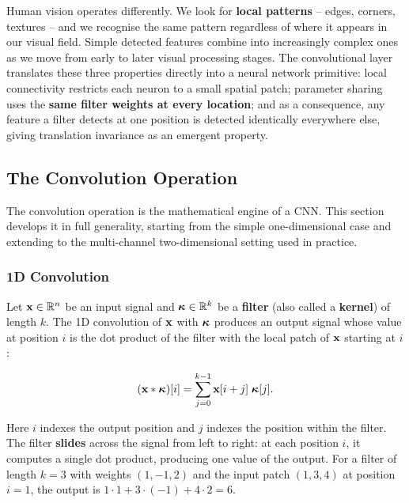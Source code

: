Human vision operates differently. We look for \textbf{local patterns} -- edges, corners, textures -- and we recognise the same pattern regardless of where it appears in our visual field. Simple detected features combine into increasingly complex ones as we move from early to later visual processing stages. The convolutional layer translates these three properties directly into a neural network primitive: local connectivity restricts each neuron to a small spatial patch; parameter sharing uses the \textbf{same filter weights at every location}; and as a consequence, any feature a filter detects at one position is detected identically everywhere else, giving translation invariance as an emergent property.

\subsection{The Convolution Operation}
\label{sec:cnns:convolution}


The convolution operation is the mathematical engine of a CNN. This section develops it in full generality, starting from the simple one-dimensional case and extending to the multi-channel two-dimensional setting used in practice.

\subsubsection{1D Convolution}

Let $\mathbf{x} \in \mathbb{R}^n$ be an input signal and $\boldsymbol{\kappa} \in \mathbb{R}^k$ be a \textbf{filter} (also called a \textbf{kernel}) of length $k$. The 1D convolution of $\mathbf{x}$ with $\boldsymbol{\kappa}$ produces an output signal whose value at position $i$ is the dot product of the filter with the local patch of $\mathbf{x}$ starting at $i$:

\begin{equation}
    (\mathbf{x} * \boldsymbol{\kappa})[i] = \sum_{j=0}^{k-1} \mathbf{x}[i+j]\; \boldsymbol{\kappa}[j].
    \label{eq:conv1d}
\end{equation}

Here $i$ indexes the output position and $j$ indexes the position within the filter. The filter \textbf{slides} across the signal from left to right: at each position $i$, it computes a single dot product, producing one value of the output. For a filter of length $k = 3$ with weights $(1, -1, 2)$ and the input patch $(1, 3, 4)$ at position $i = 1$, the output is $1 \cdot 1 + 3 \cdot (-1) + 4 \cdot 2 = 6$.

